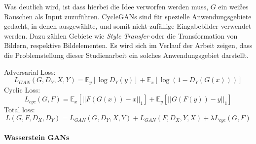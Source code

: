 Was deutlich wird, ist dass hierbei die Idee verworfen werden muss, $G$ ein weißes Rauschen als Input zuzuführen. \acp{CycleGAN} sind für spezielle Anwendungsgebiete gedacht, in denen ausgewählte, und somit nicht-zufällige Eingabebilder verwendet werden. Dazu zählen Gebiete wie \emph{Style Transfer} oder die Transformation von Bildern, respektive Bildelementen. Es wird sich im Verlauf der Arbeit zeigen, dass die Problemstellung dieser Studienarbeit ein solches Anwendungsgebiet darstellt.

Adversarial Loss:
\begin{equation}
	L_{GAN}(G, D_Y, X, Y) = \mathbb{E}_y[\log{D_Y(y)}] + \mathbb{E}_x[\log(1-D_Y(G(x)))]
\end{equation}
Cyclic Loss:
\begin{equation}
	L_{cyc}(G, F) = \mathbb{E}_x[||F(G(x))-x||_1] + \mathbb{E}_y[||G(F(y))-y||_1]
\end{equation}
Total loss:
\begin{equation}
	L(G, F, D_X, D_Y) = L_{GAN}(G, D_Y, X, Y) + L_{GAN}(F, D_X, Y, X) + \lambda L_{cyc}(G, F)
\end{equation}
\cite{cycleGAN}
\paragraph{Wasserstein GANs}

\cite{DeepLearningBook}
\cite{visualApproach}